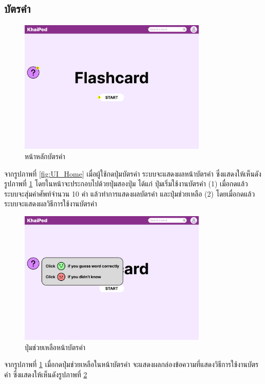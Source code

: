 \documentclass[12pt,oneside,openright,a4paper]{cpe-thai-project}
\begin{document}
\pagebreak
\subsection{บัตรคำ}
\begin{figure}[!h]\centering
	\includegraphics[width=0.8\textwidth, keepaspectratio=true]{image/chap3/ui/flashcard/Flashcard.png}
	\caption{หน้าหลักบัตรคำ}\label{fig:UI_Flashcard}
\end{figure}
\hspace{1cm}
จากรูปภาพที่ \ref{fig:UI_Home} เมื่อผู้ใช้กดปุ่มบัตรคำ ระบบจะแสดงผลหน้าบัตรคำ ซึ่งแสดงให้เห็นดังรูปภาพที่ \ref{fig:UI_Flashcard}
โดยในหน้าจะประกอบไปด้วยปุ่มสองปุ่ม ได้แก่ ปุ่มเริ่มใช้งานบัตรคำ (1) เมื่อกดแล้ว ระบบจะสุ่มคำศัพท์จำนวน 10 คำ
แล้วทำการแสดงผลบัตรคำ และปุ่มช่วยเหลือ (2) โดยเมื่อกดแล้ว ระบบจะแสดงผลวิธีการใช้งานบัตรคำ

\begin{figure}[!h]\centering
	\includegraphics[width=0.8\textwidth, keepaspectratio=true]{image/chap3/ui/flashcard/Flashcard - Help.png}
	\caption{ปุ่มช่วยเหลือหน้าบัตรคำ}\label{fig:UI_FlashcardHelp}
\end{figure}
\hspace{1cm}
จากรูปภาพที่ \ref{fig:UI_Flashcard} เมื่อกดปุ่มช่วยเหลือในหน้าบัตรคำ จะแสดงผลกล่องข้อความที่แสดงวิธีการใช้งานบัตรคำ ซึ่งแสดงให้เห็นดังรูปภาพที่ \ref{fig:UI_FlashcardHelp}
\end{document}
